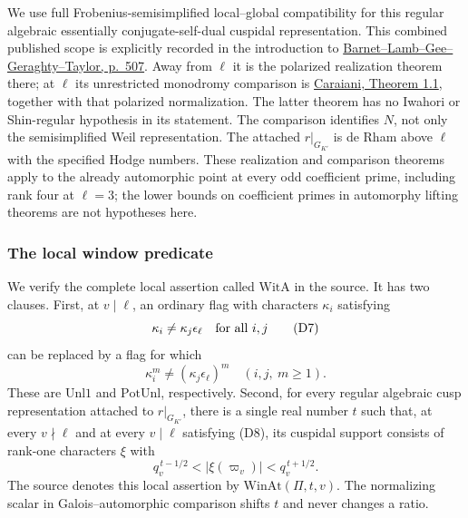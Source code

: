 We use full Frobenius-semisimplified local--global
compatibility for this regular algebraic essentially
conjugate-self-dual cuspidal representation.
This combined published scope is explicitly recorded in the
introduction to
\href{https://annals.math.princeton.edu/wp-content/uploads/annals-v179-n2-p03-p.pdf}
{Barnet--Lamb--Gee--Geraghty--Taylor, p.~507}.
Away from \(\ell\) it is the polarized realization theorem
there; at \(\ell\) its unrestricted monodromy comparison is
\href{https://arxiv.org/pdf/1202.4683}
{Caraiani, Theorem 1.1}, together with that polarized
normalization.
The latter theorem has no Iwahori or Shin-regular
hypothesis in its statement.
The comparison identifies \(N\), not only the
semisimplified Weil representation.
The attached \(r|_{G_{K'}}\) is de Rham above \(\ell\)
with the specified Hodge numbers.
These realization and comparison theorems apply to the
already automorphic point at every odd coefficient prime,
including rank four at \(\ell=3\);
the lower bounds on coefficient primes in automorphy
lifting theorems are not hypotheses here.

\subsubsection{The local window predicate}
We verify the complete local assertion called
\(\mathrm{WitA}\) in the source.
It has two clauses.
First, at \(v\mid\ell\), an ordinary flag with characters
\(\kappa_i\) satisfying
\[
                         \kappa_i\ne\kappa_j\epsilon_\ell
                                \quad\hbox{for all }i,j
 \tag{D7}
\]
can be replaced by a flag for which
\[
                    \kappa_i^m\ne
                      (\kappa_j\epsilon_\ell)^m
                       \quad(i,j,\ m\ge1).
 \tag{D8}
\]
These are \(\mathrm{Unl1}\) and
\(\mathrm{PotUnl}\), respectively.
Second, for every regular algebraic cusp representation
attached to \(r|_{G_{K'}}\), there is a single real number \(t\)
such that, at every \(v\nmid\ell\) and at every \(v\mid\ell\)
satisfying (D8), its cuspidal support consists of rank-one
characters \(\xi\) with
\[
                 q_v^{\,t-1/2}<|\xi(\varpi_v)|
                                  <q_v^{\,t+1/2}.
 \tag{D9}
\]
The source denotes this local assertion by
\(\mathrm{WinAt}(\Pi,t,v)\).
The normalizing scalar in Galois--automorphic comparison
shifts \(t\) and never changes a ratio.

